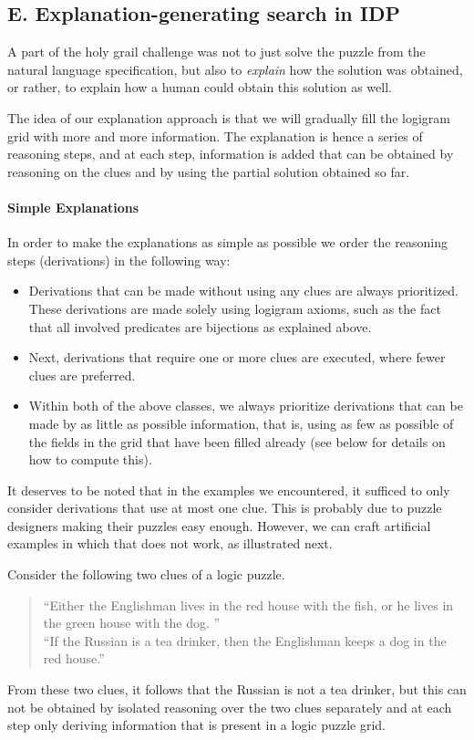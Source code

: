 \subsection{E. Explanation-generating search in IDP} 
A part of the holy grail challenge was not to just solve the puzzle from the natural language specification, but also to \emph{explain} how the solution was obtained, or rather, to explain how a human could obtain this solution as well. 

The idea of our explanation approach is that we will gradually fill the logigram grid with more and more information. The explanation is hence a series of reasoning steps, and at each step, information is added that can be obtained by reasoning on the clues and by using the partial solution obtained so far. 

\paragraph{Simple Explanations}
In order to make the explanations as simple as possible we order the reasoning steps (derivations) in the following way: 
\begin{itemize}
 \item Derivations that can be made without using any clues are always prioritized. These derivations are made solely using logigram axioms, such as the fact that all involved predicates are bijections as explained above. %
 \item Next, derivations that require one or more clues are executed, where fewer clues are preferred. 
 \item Within both of the above classes, we always prioritize derivations that can be made by as little as possible information, that is, using as few as possible of the fields in the grid that have been filled already (see below for details on how to compute this).
\end{itemize}
It deserves to be noted that in the examples we encountered, it sufficed to only consider derivations that use at most one clue. This is probably due to puzzle designers making their puzzles easy enough. However, we can craft artificial examples in which that does not work, as illustrated next. 
\begin{example}
 Consider the following two clues of a logic puzzle. 
 \begin{quote}
  ``Either the Englishman lives in the red house with the fish, or he lives in the green house with the dog. '' \\
  ``If the Russian is a tea drinker, then the Englishman keeps a dog in the red house.'' 
 \end{quote}
From these two clues, it follows that the Russian is not a tea drinker, but this can not be obtained by isolated reasoning over the two clues separately and at each step only deriving information that is present in a logic puzzle grid.  
\end{example}

